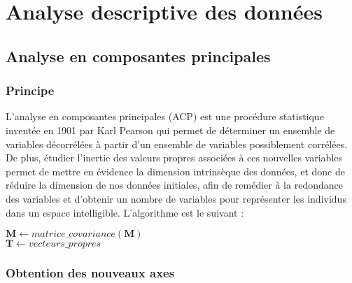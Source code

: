 \documentclass[11pt,fleqn,a4paper,openany,frenchb]{book} %
\begin{document}
\chapter{Analyse descriptive des données}
\section{Analyse en composantes principales}
\subsection{Principe}
L'analyse en composantes principales (ACP) est une procédure statistique inventée en 1901 par Karl Pearson qui permet de déterminer un ensemble de variables décorrélées à partir d'un ensemble de variables possiblement corrélées. De plus, étudier l'inertie des valeurs propres associées à ces nouvelles variables permet de mettre en évidence la dimension intrinsèque des données, et donc de réduire la dimension de nos données initiales, afin de remédier à la redondance des variables et d'obtenir un nombre de variables pour représenter les individus dans un espace intelligible. L'algorithme est le suivant : \vspace{0.2cm}\par

\begin{definition}
\begin{algorithm}[H]
 \BlankLine
 \label{cmt} 
 \BlankLine
 $\mathbf{M}\leftarrow matrice\_covariance(\mathbf{M})$\\
 $\mathbf{T}\leftarrow vecteurs\_propres$
\end{algorithm}

\end{definition}
\subsection{Obtention des nouveaux axes }
\end{document}

